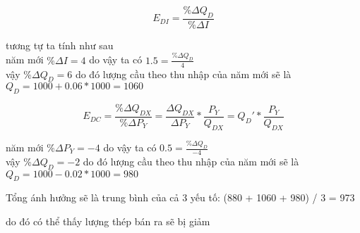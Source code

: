 \[ E_{DI} =
  \frac{\% \Delta Q_D}{\% \Delta I} \]

tương tự ta tính như sau \\
năm mới $\%\Delta I = 4$ do vậy ta có $1.5 = \frac{\%\Delta Q_D}{4}$ \\
vậy $\%\Delta Q_D = 6$ do đó lượng cầu theo thu nhập của năm mới sẽ là \\
$Q_D = 1000 + 0.06 * 1000 = 1060$


\[ E_{DC} = \frac{\% \Delta Q_{DX}}{\% \Delta P_{Y}}
  =  \frac{ \Delta Q_{DX}}{\Delta P_{Y}} * \frac{P_{Y}}{Q_{DX}}
  = Q_D' *  \frac{P_{Y}}{Q_{DX}} \]

năm mới $\%\Delta P_{Y} = -4$ do vậy ta có $0.5 = \frac{\%\Delta Q_D}{-4}$ \\
vậy $\%\Delta Q_D = -2$ do đó lượng cầu theo thu nhập của năm mới sẽ là \\
$Q_D = 1000 - 0.02 * 1000 = 980$

Tổng ánh hưởng sẽ là trung bình của cả 3 yếu tố:
(880 + 1060 + 980) / 3 = 973

do đó có thể thấy lượng thép bán ra sẽ bị giảm
